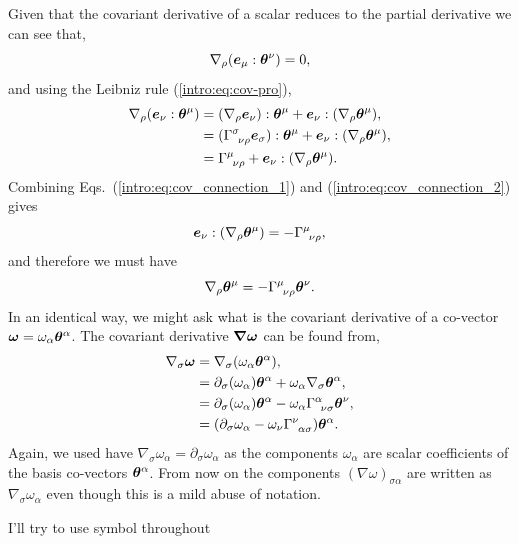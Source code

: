 Given that the covariant derivative of a scalar reduces to the partial derivative we can see that,
\begin{equation}
\nabla_\rho (\boldsymbol{e}_\mu : \boldsymbol{\theta}^\nu) = 0,\label{intro:eq:cov_connection_1}
\end{equation}
and using the Leibniz rule (\ref{intro:eq:cov-pro}),
\begin{align}
\nabla_\rho (\boldsymbol{e}_\nu : \boldsymbol{\theta}^\mu) &= (\nabla_\rho \boldsymbol{e}_\nu):\boldsymbol{\theta}^\mu + \boldsymbol{e}_\nu:(\nabla_\rho \boldsymbol{\theta}^\mu),\\
 &= (\Gamma^\sigma_{\,\,\,\nu\rho}\boldsymbol{e}_\sigma):\boldsymbol{\theta}^\mu + \boldsymbol{e}_\nu:(\nabla_\rho \boldsymbol{\theta}^\mu),\\
  &= \Gamma^\mu_{\,\,\,\nu\rho} + \boldsymbol{e}_\nu:(\nabla_\rho \boldsymbol{\theta}^\mu). \label{intro:eq:cov_connection_2}
\end{align}
Combining Eqs.~(\ref{intro:eq:cov_connection_1}) and (\ref{intro:eq:cov_connection_2}) gives
\begin{equation}
  \boldsymbol{e}_\nu:(\nabla_\rho \boldsymbol{\theta}^\mu) = -\Gamma^\mu_{\,\,\,\nu\rho},
\end{equation}
and therefore we must have
\begin{equation}
\nabla_\rho \boldsymbol{\theta}^\mu = -\Gamma^\mu_{\,\,\,\nu\rho} \boldsymbol{\theta}^\nu.
\end{equation}
In an identical way, we might ask what is the covariant derivative of a co-vector $\boldsymbol{\omega}=\omega_\alpha \boldsymbol{\theta}^\alpha$. The covariant derivative $\boldsymbol{\nabla \omega}$ can be found from,
\begin{align}
\nabla_\sigma \boldsymbol {\omega} &= \nabla_\sigma(\omega_\alpha \boldsymbol{\theta}^\alpha),\\
&= \partial_\sigma(\omega_\alpha) \boldsymbol{\theta}^\alpha + \omega_\alpha  \nabla_\sigma \boldsymbol{\theta}^\alpha,\\
&= \partial_\sigma(\omega_\alpha) \boldsymbol{\theta}^\alpha - \omega_\alpha \Gamma^\alpha_{\,\,\,\nu\sigma} \boldsymbol\theta^\nu ,\\
&= (\partial_\sigma\omega_\alpha  - \omega_\nu \Gamma^\nu_{\,\,\,\alpha\sigma} )\boldsymbol\theta^\alpha .
\end{align}
Again, we used have $\nabla_\sigma \omega_\alpha = \partial_\sigma \omega_\alpha$ as the components $\omega_\alpha$ are scalar coefficients of the basis co-vectors $\boldsymbol{\theta}^\alpha$. From now on the components $(\nabla \omega)_{\sigma\alpha} $ are written as $ \nabla_\sigma \omega_\alpha$ even though this is a mild abuse of notation.

\color{choral} I'll try to use symbol throughout \color{black}

